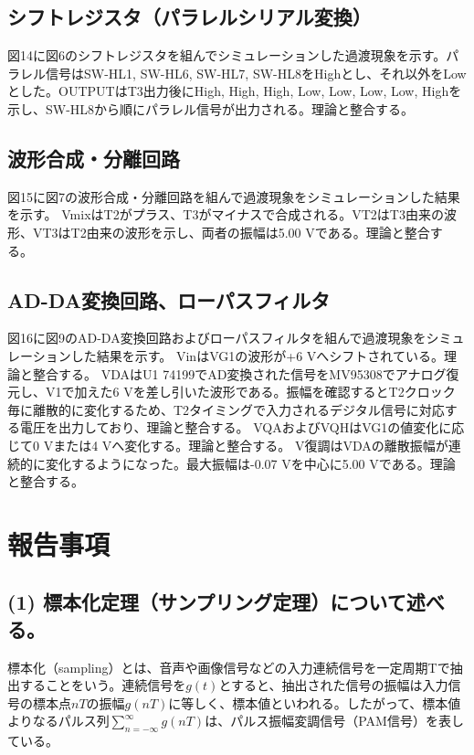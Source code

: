 \documentclass[
  a4paper,
  11pt,
]{ltjsarticle}
\begin{document}
\subsection{シフトレジスタ（パラレルシリアル変換）}
図14に図6のシフトレジスタを組んでシミュレーションした過渡現象を示す。パラレル信号はSW-HL1, SW-HL6, SW-HL7, SW-HL8をHighとし、それ以外をLowとした。OUTPUTはT3出力後にHigh, High, High, Low, Low, Low, Low, Highを示し、SW-HL8から順にパラレル信号が出力される。理論と整合する。

\subsection{波形合成・分離回路}
図15に図7の波形合成・分離回路を組んで過渡現象をシミュレーションした結果を示す。
VmixはT2がプラス、T3がマイナスで合成される。VT2はT3由来の波形、VT3はT2由来の波形を示し、両者の振幅は5.00 \si{\volt}である。理論と整合する。

\subsection{AD-DA変換回路、ローパスフィルタ}
図16に図9のAD-DA変換回路およびローパスフィルタを組んで過渡現象をシミュレーションした結果を示す。
VinはVG1の波形が+6 \si{\volt}へシフトされている。理論と整合する。
VDAはU1 74199でAD変換された信号をMV95308でアナログ復元し、V1で加えた6 Vを差し引いた波形である。振幅を確認するとT2クロック毎に離散的に変化するため、T2タイミングで入力されるデジタル信号に対応する電圧を出力しており、理論と整合する。
VQAおよびVQHはVG1の値変化に応じて0 \si{\volt}または4 \si{\volt}へ変化する。理論と整合する。
V復調はVDAの離散振幅が連続的に変化するようになった。最大振幅は-0.07 \si{\volt}を中心に5.00 \si{\volt}である。理論と整合する。

\section{報告事項}

\subsection{(1) 標本化定理（サンプリング定理）について述べる。}
標本化（sampling）とは、音声や画像信号などの入力連続信号を一定周期Tで抽出することをいう。連続信号を$g(t)$とすると、抽出された信号の振幅は入力信号の標本点$nT$の振幅$g(nT)$に等しく、標本値といわれる。したがって、標本値よりなるパルス列$\sum_{n=-\infty}^{\infty}g(nT)$は、パルス振幅変調信号（PAM信号）を表している。
\end{document}
